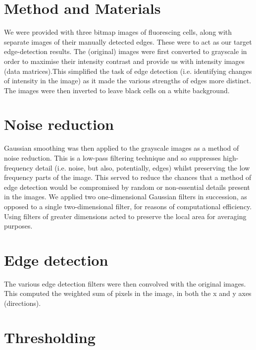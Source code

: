 \documentclass[a4paper]{article}
\begin{document}
\begin{multicols*}{2}
\section*{Method and Materials}

We were provided with three bitmap images of fluorescing cells, along with separate images of their manually detected edges. These were to act as our target edge-detection results.
The (original) images were first converted to grayscale in order to maximise their intensity contrast and provide us with intensity images (data matrices).This simplified the task of edge detection (i.e. identifying changes of intensity in the image) as it made the various strengths of edges more distinct. The images were then inverted to leave black cells on a white background. 

\section*{Noise reduction}

Gaussian smoothing was then applied to the grayscale images as a method of noise reduction. This is a low-pass filtering technique and so suppresses high-frequency detail (i.e. noise, but also, potentially, edges) whilst preserving the low frequency parts of the image. This served to reduce the chances that a method of edge detection would be compromised by random or non-essential details present in the images. We applied two one-dimensional Gaussian filters in succession, as opposed to a single two-dimensional filter, for reasons of computational efficiency. Using filters of greater dimensions acted to preserve the local area for averaging purposes. 

\section*{Edge detection}

The various edge detection filters were then convolved with the original images. This computed the weighted sum of pixels in the image, in both the x and y axes (directions).

\section*{Thresholding}


\end{multicols*}
\end{document}

